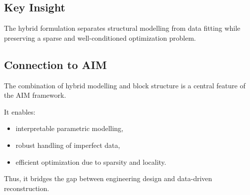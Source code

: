 \subsection{Key Insight}

\begin{proposition}
The hybrid formulation separates structural modelling from data fitting
while preserving a sparse and well-conditioned optimization problem.
\end{proposition}

\subsection{Connection to AIM}

\begin{summary}
The combination of hybrid modelling and block structure is a central
feature of the AIM framework.

It enables:
\begin{itemize}
\item interpretable parametric modelling,
\item robust handling of imperfect data,
\item efficient optimization due to sparsity and locality.
\end{itemize}

Thus, it bridges the gap between engineering design and data-driven
reconstruction.
\end{summary}
